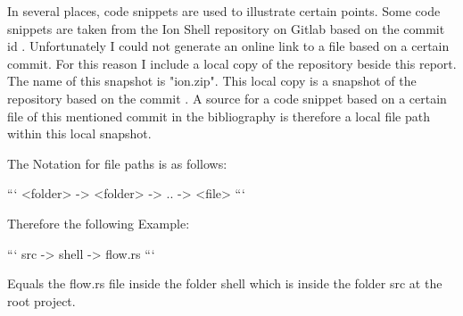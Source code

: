 In several places, code snippets are used to illustrate certain points.
Some code snippets are taken from the Ion Shell repository on Gitlab \cite{ion_shell}
based on the commit id \commitid.
Unfortunately I could not generate an online link to a file based on a certain commit.
For this reason I include a local copy of the repository beside this report.
The name of this snapshot is "ion.zip".
This local copy is a snapshot of the repository based on the commit \commitid.
A source for a code snippet based on a certain file of this mentioned commit in the bibliography
is therefore a local file path within this local snapshot.

The Notation for file paths is as follows:

```
<folder> -> <folder> -> .. -> <file>
```

Therefore the following Example:

```
src -> shell -> flow.rs
```

Equals the flow.rs file inside the folder shell which is inside the folder src at the root project.

